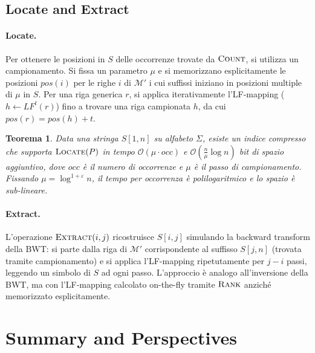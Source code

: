 \documentclass[12pt, a4paper, oneside]{book}
\theoremstyle{plain}
\newtheorem{teorema}{Teorema}[chapter]
\theoremstyle{definition}
\theoremstyle{remark}
\newcommand{\OO}[1]{\mathcal{O}\!\left(#1\right)}
\begin{document}
\subsection{Locate and Extract}
\label{subsec:locate-extract}

\paragraph{Locate.} Per ottenere le posizioni in $S$ delle occorrenze trovate da $\textsc{Count}$, si utilizza un campionamento. Si fissa un parametro $\mu$ e si memorizzano esplicitamente le posizioni $pos(i)$ per le righe $i$ di $\mathcal{M}'$ i cui suffissi iniziano in posizioni multiple di $\mu$ in $S$. Per una riga generica $r$, si applica iterativamente l'LF-mapping ($h \gets LF^t(r)$) fino a trovare una riga campionata $h$, da cui $pos(r) = pos(h) + t$.

\begin{teorema}
\label{thm:locate-complexity}
Data una stringa $S[1,n]$ su alfabeto $\Sigma$, esiste un indice compresso che supporta $\textsc{Locate}(P)$ in tempo $\OO{\mu \cdot occ}$ e $\OO{\frac{n}{\mu} \log n}$ bit di spazio aggiuntivo, dove $occ$ è il numero di occorrenze e $\mu$ è il passo di campionamento. Fissando $\mu = \log^{1+\varepsilon} n$, il tempo per occorrenza è polilogaritmico e lo spazio è sub-lineare.
\end{teorema}

\paragraph{Extract.} L'operazione $\textsc{Extract}(i, j)$ ricostruisce $S[i, j]$ simulando la backward transform della BWT: si parte dalla riga di $\mathcal{M}'$ corrispondente al suffisso $S[j, n]$ (trovata tramite campionamento) e si applica l'LF-mapping ripetutamente per $j - i$ passi, leggendo un simbolo di $S$ ad ogni passo. L'approccio è analogo all'inversione della BWT, ma con l'LF-mapping calcolato on-the-fly tramite $\textsc{Rank}$ anziché memorizzato esplicitamente.

\section{Summary and Perspectives}
\label{sec:compressed-ds-summary}
\end{document}
